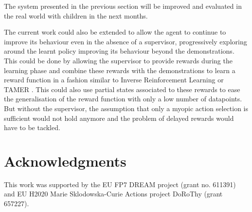 \documentclass[letterpaper]{article} %
\begin{document}
The system presented in the previous section will be improved and
evaluated in the real world with children in the next months.

The current work could also be extended to allow the agent to continue to improve its
behaviour even in the absence of a supervisor, progressively exploring around the
learnt policy improving its behaviour beyond the demonstrations. This
could be done by allowing the supervisor to provide rewards during the learning
phase and combine these rewards with the demonstrations to learn a reward
function in a fashion similar to Inverse Reinforcement Learning
\cite{abbeel2004apprenticeship} or TAMER \cite{knox2009interactively}. This
could also use partial states associated to these rewards to ease the
generalisation of the reward function with only a low number of datapoints.
But without the supervisor, the assumption that only a
myopic action selection is sufficient would not hold anymore and the problem of
delayed rewards would have to be tackled.
\section{Acknowledgments}
This work was supported by the EU FP7 DREAM project (grant no.  611391) and EU
H2020 Marie Sklodowska-Curie Actions project DoRoThy (grant 657227).  

 
\end{document}
